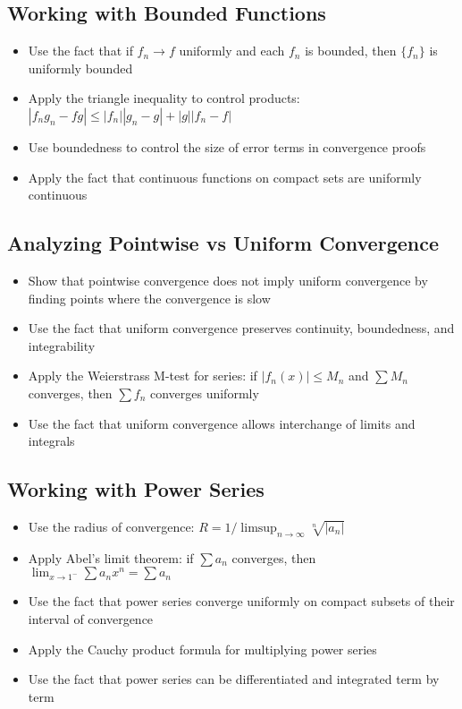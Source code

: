 \subsection*{Working with Bounded Functions}
\begin{itemize}
\item Use the fact that if $f_n \to f$ uniformly and each $f_n$ is bounded, then $\{f_n\}$ is uniformly bounded
\item Apply the triangle inequality to control products: $|f_n g_n - fg| \leq |f_n| |g_n - g| + |g| |f_n - f|$
\item Use boundedness to control the size of error terms in convergence proofs
\item Apply the fact that continuous functions on compact sets are uniformly continuous
\end{itemize}

\subsection*{Analyzing Pointwise vs Uniform Convergence}
\begin{itemize}
\item Show that pointwise convergence does not imply uniform convergence by finding points where the convergence is slow
\item Use the fact that uniform convergence preserves continuity, boundedness, and integrability
\item Apply the Weierstrass M-test for series: if $|f_n(x)| \leq M_n$ and $\sum M_n$ converges, then $\sum f_n$ converges uniformly
\item Use the fact that uniform convergence allows interchange of limits and integrals
\end{itemize}

\subsection*{Working with Power Series}
\begin{itemize}
\item Use the radius of convergence: $R = 1/\limsup_{n \to \infty} \sqrt[n]{|a_n|}$
\item Apply Abel's limit theorem: if $\sum a_n$ converges, then $\lim_{x \to 1^-} \sum a_n x^n = \sum a_n$
\item Use the fact that power series converge uniformly on compact subsets of their interval of convergence
\item Apply the Cauchy product formula for multiplying power series
\item Use the fact that power series can be differentiated and integrated term by term
\end{itemize}

